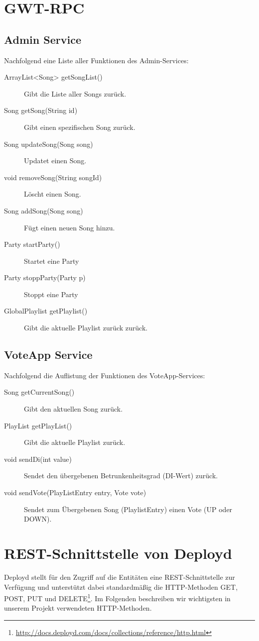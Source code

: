 \section{GWT-RPC}

\subsection{Admin Service}
Nachfolgend eine Liste aller Funktionen des Admin-Services:
\begin{description}
	\item[ArrayList<Song> getSongList()] Gibt die Liste aller Songs zurück.
	\item[Song getSong(String id)] Gibt einen spezifischen Song zurück.
	\item[Song updateSong(Song song)] Updatet einen Song.
	\item[void removeSong(String songId)]	Löscht einen Song.
	\item[Song addSong(Song song)] Fügt einen neuen Song hinzu.
	\item[Party startParty()]	Startet eine Party
	\item[Party stoppParty(Party p)] Stoppt eine Party
	\item[GlobalPlaylist getPlaylist()] Gibt die aktuelle Playlist zurück zurück.
\end{description}


\subsection{VoteApp Service}
Nachfolgend die Auflistung der Funktionen des VoteApp-Services:
\begin{description}
	\item[Song getCurrentSong()] Gibt den aktuellen Song zurück.
	\item[PlayList getPlayList()]	Gibt die aktuelle Playlist zurück.
	\item[void sendDi(int value)] Sendet den übergebenen Betrunkenheitsgrad (DI-Wert) zurück.
	\item[void sendVote(PlayListEntry entry, Vote vote)] Sendet zum Übergebenen Song (PlaylistEntry) einen Vote (UP oder DOWN).
\end{description}

\section{REST-Schnittstelle von Deployd}
\label{anh:rest}
Deployd stellt für den Zugriff auf die Entitäten eine REST-Schnittstelle zur Verfügung und unterstützt dabei standardmäßig die HTTP-Methoden GET, POST, PUT und DELETE\footnote{\url{http://docs.deployd.com/docs/collections/reference/http.html}}. Im Folgenden beschreiben wir wichtigsten in unserem Projekt verwendeten HTTP-Methoden.

